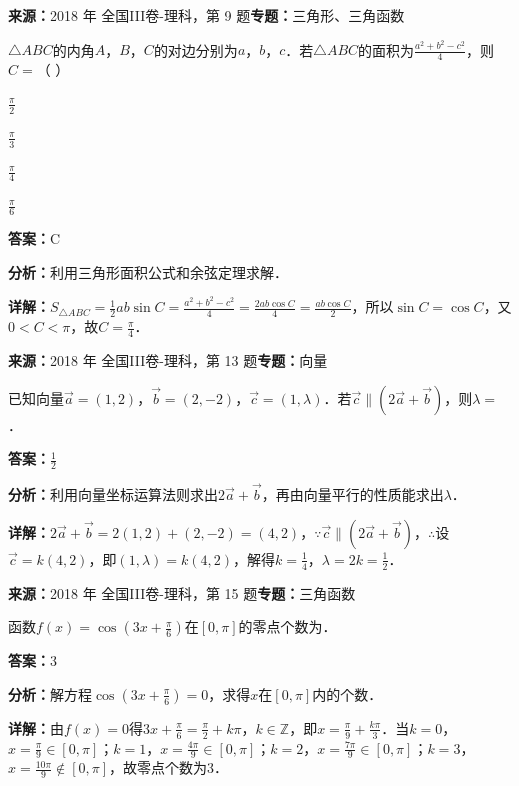 \begin{question}[points=5]
\textbf{来源：}2018 年 全国III卷-理科，第 9 题\quad \textbf{专题：}三角形、三角函数\par
$\triangle ABC$的内角$A$，$B$，$C$的对边分别为$a$，$b$，$c$．若$\triangle ABC$的面积为$\frac{a^2+b^2-c^2}{4}$，则$C=$（ ）
\begin{choices}
  \item $\frac{\pi}{2}$
  \item $\frac{\pi}{3}$
  \item $\frac{\pi}{4}$
  \item $\frac{\pi}{6}$
\end{choices}
\begin{solution}
\textbf{答案：}C

\textbf{分析：}利用三角形面积公式和余弦定理求解．

\textbf{详解：}$S_{\triangle ABC}=\frac{1}{2}ab\sin C = \frac{a^2+b^2-c^2}{4} = \frac{2ab\cos C}{4} = \frac{ab\cos C}{2}$，所以$\sin C = \cos C$，又$0<C<\pi$，故$C=\frac{\pi}{4}$．
\end{solution}
\end{question}

\begin{question}[points=5]
\textbf{来源：}2018 年 全国III卷-理科，第 13 题\quad \textbf{专题：}向量\par
已知向量$\vec{a}=(1,2)$，$\vec{b}=(2,-2)$，$\vec{c}=(1,\lambda)$．若$\vec{c}\parallel(2\vec{a}+\vec{b})$，则$\lambda=$．
\fillin[{$\frac{1}{2}$}]
\begin{solution}
\textbf{答案：}$\frac{1}{2}$

\textbf{分析：}利用向量坐标运算法则求出$2\vec{a}+\vec{b}$，再由向量平行的性质能求出$\lambda$．

\textbf{详解：}$2\vec{a}+\vec{b}=2(1,2)+(2,-2)=(4,2)$，$\because \vec{c}\parallel(2\vec{a}+\vec{b})$，$\therefore$设$\vec{c}=k(4,2)$，即$(1,\lambda)=k(4,2)$，解得$k=\frac{1}{4}$，$\lambda=2k=\frac{1}{2}$．
\end{solution}
\end{question}

\begin{question}[points=5]
\textbf{来源：}2018 年 全国III卷-理科，第 15 题\quad \textbf{专题：}三角函数\par
函数$f(x)=\cos(3x+\frac{\pi}{6})$在$[0,\pi]$的零点个数为．
\fillin[{$3$}]
\begin{solution}
\textbf{答案：}$3$

\textbf{分析：}解方程$\cos(3x+\frac{\pi}{6})=0$，求得$x$在$[0,\pi]$内的个数．

\textbf{详解：}由$f(x)=0$得$3x+\frac{\pi}{6}=\frac{\pi}{2}+k\pi$，$k\in\mathbb{Z}$，即$x=\frac{\pi}{9}+\frac{k\pi}{3}$．当$k=0$，$x=\frac{\pi}{9}\in[0,\pi]$；$k=1$，$x=\frac{4\pi}{9}\in[0,\pi]$；$k=2$，$x=\frac{7\pi}{9}\in[0,\pi]$；$k=3$，$x=\frac{10\pi}{9}\notin[0,\pi]$，故零点个数为3．
\end{solution}
\end{question}

